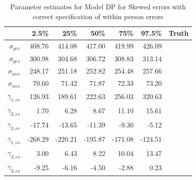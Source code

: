 \documentclass[11pt]{article}\usepackage[]{graphicx}\usepackage[]{color}
\begin{document}
\begin{table}[ht]
\centering
\begin{tabular}{rrrrrr|r}
  \hline
 & 2.5\% & 25\% & 50\% & 75\% & 97.5\% & Truth \\
  \hline
$\sigma_{yee}$ & 408.76 & 414.08 & 417.00 & 419.99 & 426.09 \\ 
  $\sigma_{yes}$ & 300.98 & 304.68 & 306.72 & 308.83 & 313.14 \\ 
  $\sigma_{wee}$ & 248.17 & 251.18 & 252.82 & 254.48 & 257.66 \\ 
  $\sigma_{wes}$ & 70.60 & 71.42 & 71.87 & 72.33 & 73.20 \\ 
  $\gamma_{1,ee}$ & 126.93 & 189.61 & 222.63 & 256.03 & 320.63 \\ 
  $\gamma_{2,ee}$ & 1.70 & 6.28 & 8.67 & 11.10 & 15.61 \\ 
  $\gamma_{3,ee}$ & -17.74 & -13.65 & -11.39 & -9.30 & -5.12 \\ 
  $\gamma_{1,es}$ & -268.29 & -220.21 & -195.87 & -171.08 & -124.51 \\ 
  $\gamma_{2,es}$ & 3.00 & 6.43 & 8.22 & 10.04 & 13.47 \\ 
  $\gamma_{3,es}$ & -9.25 & -6.16 & -4.50 & -2.88 & 0.23 \\ 
   \hline
\end{tabular}
\caption{Parameter estimates for Model DP for Skewed errors with correct specification of within person errors}
\label{mdpswpestimates}
\end{table}
\end{document}
